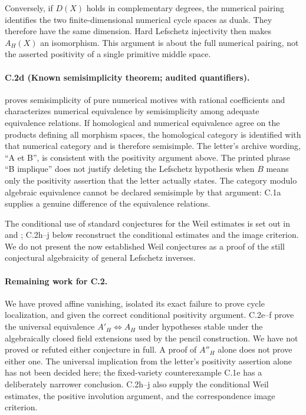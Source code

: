 Conversely, if $D(X)$ holds in complementary degrees, the numerical
pairing identifies the two finite-dimensional numerical cycle spaces
as duals. They therefore have the same dimension. Hard Lefschetz
injectivity then makes $A_H(X)$ an isomorphism. This argument is about
the full numerical pairing, not the asserted positivity of a single
primitive middle space.

\paragraph{C.2d (Known semisimplicity theorem; audited quantifiers).}
\citet[Theorem 1]{Jannsen1992} proves semisimplicity of pure numerical
motives with rational coefficients and characterizes numerical
equivalence by semisimplicity among adequate equivalence relations.
If homological and numerical equivalence agree on the products defining
all morphism spaces, the homological category is identified with that
numerical category and is therefore semisimple. The letter's archive
wording, ``A et B'', is consistent with the positivity argument above.
The printed phrase ``B implique'' does not justify deleting the
Lefschetz hypothesis when $B$ means only the positivity assertion that
the letter actually states. The category modulo algebraic equivalence
cannot be declared semisimple by that argument: C.1a supplies a genuine
difference of the equivalence relations.

The conditional use of standard conjectures for the Weil estimates is
set out in \citet[Sections 2--4]{cyGrothendieck1969} and
\citet[Propositions 3.6, 3.8 and Corollary 3.9]{cyKleiman1968};
C.2h--j below reconstruct the conditional estimates and the image
criterion. We do not present the now established Weil conjectures as a proof
of the still conjectural algebraicity of general Lefschetz inverses.



\paragraph{Remaining work for C.2.}
We have proved affine vanishing, isolated its exact failure to prove
cycle localization, and given the correct conditional positivity
argument. C.2e--f prove the universal equivalence
$A'_H\Longleftrightarrow A_H$ under hypotheses stable under the
algebraically closed field extensions used by the pencil construction.
We have not proved or refuted either conjecture in full.
A proof of $A''_H$ alone does not prove either one.
The universal implication from the letter's
positivity assertion alone has not been decided here; the fixed-variety
counterexample C.1e has a deliberately narrower conclusion.
C.2h--j also supply the conditional Weil estimates, the positive
involution argument, and the correspondence image criterion.

